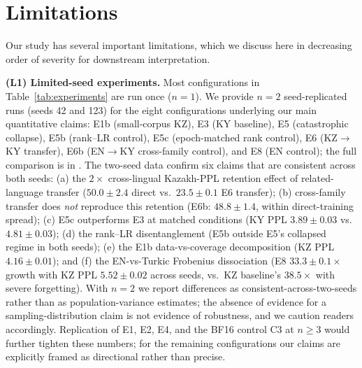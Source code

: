 \documentclass[11pt]{article}
\begin{document}
\section{Limitations}
\label{sec:limitations}

Our study has several important limitations, which we discuss here in decreasing order of severity for downstream interpretation.

\textbf{(L1) Limited-seed experiments.} Most configurations in Table~\ref{tab:experiments} are run once ($n{=}1$). We provide $n{=}2$ seed-replicated runs (seeds 42 and 123) for the eight configurations underlying our main quantitative claims: E1b (small-corpus KZ), E3 (KY baseline), E5 (catastrophic collapse), E5b (rank--LR control), E5c (epoch-matched rank control), E6 (KZ$\rightarrow$KY transfer), E6b (EN$\rightarrow$KY cross-family control), and E8 (EN control); the full comparison is in . The two-seed data confirm six claims that are consistent across both seeds: (a) the $2\times$ cross-lingual Kazakh-PPL retention effect of related-language transfer ($50.0\pm 2.4$ direct vs.\ $23.5\pm 0.1$ E6 transfer); (b) cross-family transfer does \emph{not} reproduce this retention (E6b: $48.8 \pm 1.4$, within direct-training spread); (c) E5c outperforms E3 at matched conditions (KY PPL $3.89 \pm 0.03$ vs.\ $4.81 \pm 0.03$); (d) the rank--LR disentanglement (E5b outside E5's collapsed regime in both seeds); (e) the E1b data-vs-coverage decomposition (KZ PPL $4.16 \pm 0.01$); and (f) the EN-vs-Turkic Frobenius dissociation (E8 $33.3 \pm 0.1\times$ growth with KZ PPL $5.52 \pm 0.02$ across seeds, vs.\ KZ baseline's $38.5\times$ with severe forgetting). With $n{=}2$ we report differences as consistent-across-two-seeds rather than as population-variance estimates; the absence of evidence for a sampling-distribution claim is not evidence of robustness, and we caution readers accordingly. Replication of E1, E2, E4, and the BF16 control C3 at $n{\geq}3$ would further tighten these numbers; for the remaining configurations our claims are explicitly framed as directional rather than precise.
\end{document}
